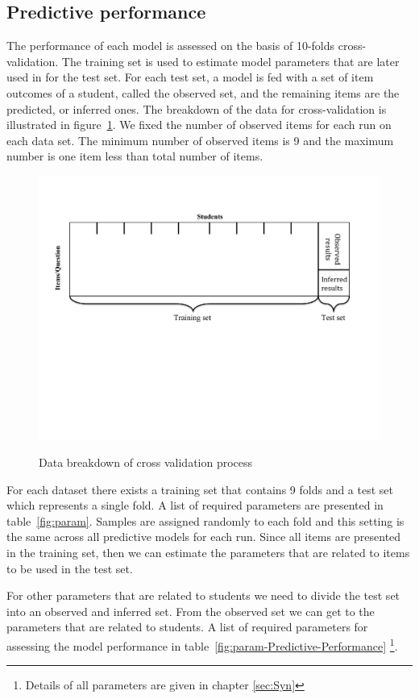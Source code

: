\subsection{Predictive performance}

The performance of each model is assessed on the basis of 10-folds cross-validation.  The training set is used to estimate model parameters that are later used in for the test set. For each test set, a model is fed with a set of item outcomes of a student, called the observed set, and the remaining items are the predicted, or inferred ones. The breakdown of the data for cross-validation is illustrated in figure~\ref{figMethod}. We fixed the number of observed items for each run on each data set. The minimum number of observed items is 9 and the maximum number is one item less than total number of items. 

\begin{figure}[h]
\centering
{\includegraphics[trim=1cm 9cm 2.4cm 2.4cm,clip=true,width=.7\textwidth]{images/Methodology.pdf}}
\caption{Data breakdown of cross validation process}
\label{figMethod}
\end{figure}

For each dataset there exists a training set that contains 9 folds and a test set which represents a single fold. A list of required parameters are presented in table~\ref{fig:param}. Samples are assigned randomly to each fold and this setting is the same across all predictive models for each run. Since all items are presented in the training set, then we can estimate the parameters that are related to items to be used in the test set. 

For other parameters that are related to students we need to divide the test set into an observed and inferred set. From the observed set we can get to the parameters that are related to students. A list of required parameters for assessing the model performance in table~\ref{fig:param-Predictive-Performance} \footnote{Details of all parameters are given in chapter \ref{sec:Syn}}.

